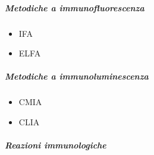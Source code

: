 \documentclass[italian,]{article}
\providecommand{\tightlist}{%
  \setlength{\itemsep}{0pt}\setlength{\parskip}{0pt}}
\begin{document}
\hypertarget{metodiche-a-immunofluorescenza}{%
\subparagraph{Metodiche a
immunofluorescenza}\label{metodiche-a-immunofluorescenza}}

\begin{itemize}
\tightlist
\item
  IFA
\item
  ELFA
\end{itemize}

\hypertarget{metodiche-a-immunoluminescenza}{%
\subparagraph{Metodiche a
immunoluminescenza}\label{metodiche-a-immunoluminescenza}}

\begin{itemize}
\tightlist
\item
  CMIA
\item
  CLIA
\end{itemize}

\hypertarget{reazioni-immunologiche}{%
\subparagraph{Reazioni immunologiche}\label{reazioni-immunologiche}}
\end{document}
